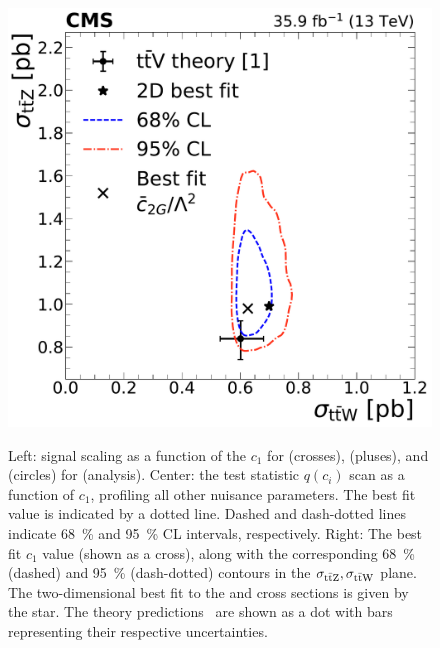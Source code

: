 \begin{landscape}
\begin{figure}
{        \includegraphics[height=\textheight]{figures/thirteen-TeV/NP/2D/ttZ_ttW_2D_1D_c2G}
      }
    \setlength{\capwidth}{14cm}
    \caption[Profile likelihood, $\mu(c_1)$, and best fit $c_1$ for \ctwoG (\thirteenTeV)]{Left: signal scaling as a function of the $c_1$ for \ttW (crosses), \ttZ (pluses), and \ttH (circles) for \ctwoG (\thirteenTeV analysis). Center: the test statistic $q(c_i)$ scan as a function of $c_1$, profiling all other nuisance parameters. The best fit value is indicated by a dotted line. Dashed and dash-dotted lines indicate \SI{68}{\percent} and \SI{95}{\percent} CL intervals, respectively. Right: The best fit $c_1$ value (shown as a cross), along with the corresponding \SI{68}{\percent} (dashed) and \SI{95}{\percent} (dash-dotted) contours in the $\sigma_{\text{t}\bar{\text{t}}\text{Z}}, \sigma_{\text{t}\bar{\text{t}}\text{W}}$ plane. The two-dimensional best fit to the \ttW and \ttZ cross sections is given by the star. The theory predictions~\cite{deFlorian:2016spz} are shown as a dot with bars representing their respective uncertainties.}
    \label{fig:results-c2G}
  \end{figure}
  \begin{figure}
      \centering
      \resizebox{!}{7.2cm}{
}
\end{figure}
\end{landscape}
